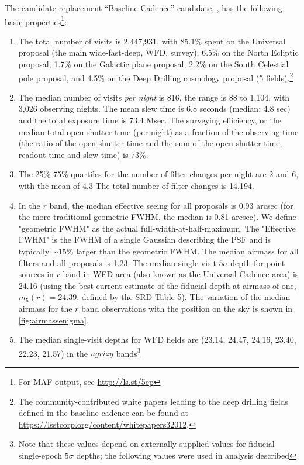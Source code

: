The candidate replacement ``Baseline Cadence'' candidate,
, has the following basic
properties\footnote{For MAF output, see \url{http://ls.st/5ep}}:
\begin{enumerate}
\item The total number of visits is 2,447,931, with 85.1\% spent on
the Universal proposal (the main wide-fast-deep, WFD, survey), 6.5\% on the
North Ecliptic proposal, 1.7\% on the Galactic plane proposal, 2.2\%
on the South Celestial pole proposal, and 4.5\% on the Deep Drilling
cosmology proposal (5 fields).\footnote{The community-contributed white papers leading to the
deep drilling fields defined in the baseline cadence can be found at
\url{https://lsstcorp.org/content/whitepapers32012}.}
\item The median number of visits {\it per night} is 816, the range is
88 to 1,104, with 3,026 observing nights. The mean slew time is 6.8
seconds (median: 4.8 sec) and the total exposure time is 73.4 Msec.
The surveying efficiency, or the median total open shutter time (per night)
as a fraction of the observing time (the ratio of the open shutter time and
the sum of the open shutter time, readout time and slew time) is 73\%.
\item
The 25\%-75\% quartiles for the number of filter changes per night are 2
and 6, with the mean of 4.3 The total number of filter changes is 14,194.
\item In the $r$ band, the median effective seeing for all proposals is 0.93 arcsec (for the more
traditional geometric FWHM, the median is 0.81 arcsec).  We define "geometric FWHM" as the actual full-width-at-half-maximum.  The "Effective FWHM" is the FWHM of a single Gaussian describing the PSF and is typically $\sim15$\% larger than the geometric FWHM. The median
airmass for all filters and all proposals is 1.23. The median single-visit $5\sigma$ depth for point sources in $r$-band in WFD 
area (also known as the Universal Cadence area) is 24.16 (using the best
current estimate of the fiducial depth at airmass of one, $m_5(r)=24.39$,
defined by the SRD Table 5). The variation of the median airmass for the $r$
band observations with the position on the sky is shown in
\autoref{fig:airmassenigma}.
\item The median single-visit depths for WFD fields are (23.14, 24.47, 24.16,
23.40, 22.23, 21.57) in the $ugrizy$ bands\footnote{Note that these values
depend on externally supplied values for fiducial single-epoch
$5\sigma$ depths; the following values were used in analysis described
}
\end{enumerate}
